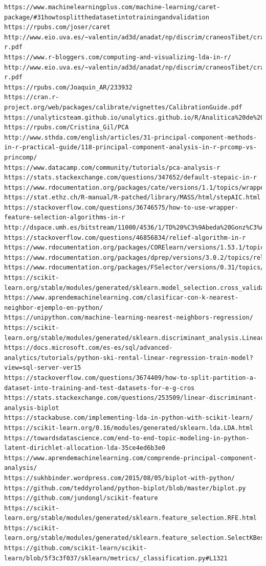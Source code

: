 \documentclass{article}
\begin{document}
\begin{lstlisting}[breaklines, numbers = none, frame = none,basicstyle=\footnotesize]
https://www.machinelearningplus.com/machine-learning/caret-package/#31howtosplitthedatasetintotrainingandvalidation
https://rpubs.com/joser/caret
http://www.eio.uva.es/~valentin/ad3d/anadat/np/discrim/craneosTibet/craneosTibet_practicas-r.pdf
https://www.r-bloggers.com/computing-and-visualizing-lda-in-r/
http://www.eio.uva.es/~valentin/ad3d/anadat/np/discrim/craneosTibet/craneosTibet_practicas-r.pdf
https://rpubs.com/Joaquin_AR/233932
https://cran.r-project.org/web/packages/calibrate/vignettes/CalibrationGuide.pdf
https://unalyticsteam.github.io/unalytics.github.io/R/Analitica%20de%20datos/02/Reescalar,_normalizar__y_variables_indicadoras.html
https://rpubs.com/Cristina_Gil/PCA
http://www.sthda.com/english/articles/31-principal-component-methods-in-r-practical-guide/118-principal-component-analysis-in-r-prcomp-vs-princomp/
https://www.datacamp.com/community/tutorials/pca-analysis-r
https://stats.stackexchange.com/questions/347652/default-stepaic-in-r
https://www.rdocumentation.org/packages/cate/versions/1.1/topics/wrapper
https://stat.ethz.ch/R-manual/R-patched/library/MASS/html/stepAIC.html
https://stackoverflow.com/questions/36746575/how-to-use-wrapper-feature-selection-algorithms-in-r
http://dspace.umh.es/bitstream/11000/4536/1/TD%20%C3%9Abeda%20Gonz%C3%A1lez%2C%20David.pdf
https://stackoverflow.com/questions/46856834/relief-algorithm-in-r
https://www.rdocumentation.org/packages/CORElearn/versions/1.53.1/topics/attrEval
https://www.rdocumentation.org/packages/dprep/versions/3.0.2/topics/relief
https://www.rdocumentation.org/packages/FSelector/versions/0.31/topics/relief
https://scikit-learn.org/stable/modules/generated/sklearn.model_selection.cross_validate.html
https://www.aprendemachinelearning.com/clasificar-con-k-nearest-neighbor-ejemplo-en-python/
https://unipython.com/machine-learning-nearest-neighbors-regression/
https://scikit-learn.org/stable/modules/generated/sklearn.discriminant_analysis.LinearDiscriminantAnalysis.html
https://docs.microsoft.com/es-es/sql/advanced-analytics/tutorials/python-ski-rental-linear-regression-train-model?view=sql-server-ver15
https://stackoverflow.com/questions/3674409/how-to-split-partition-a-dataset-into-training-and-test-datasets-for-e-g-cros
https://stats.stackexchange.com/questions/253509/linear-discriminant-analysis-biplot
https://stackabuse.com/implementing-lda-in-python-with-scikit-learn/
https://scikit-learn.org/0.16/modules/generated/sklearn.lda.LDA.html
https://towardsdatascience.com/end-to-end-topic-modeling-in-python-latent-dirichlet-allocation-lda-35ce4ed6b3e0
https://www.aprendemachinelearning.com/comprende-principal-component-analysis/
https://sukhbinder.wordpress.com/2015/08/05/biplot-with-python/
https://github.com/teddyroland/python-biplot/blob/master/biplot.py
https://github.com/jundongl/scikit-feature
https://scikit-learn.org/stable/modules/generated/sklearn.feature_selection.RFE.html
https://scikit-learn.org/stable/modules/generated/sklearn.feature_selection.SelectKBest.html
https://github.com/scikit-learn/scikit-learn/blob/5f3c3f037/sklearn/metrics/_classification.py#L1321
\end{lstlisting}
\end{document}
